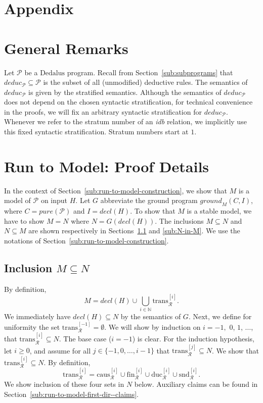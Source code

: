 \documentclass{tlp}
\newcommand{\langname}[1]{\text{#1}}  \newcommand{\pred}[1]{\mathtt{#1}}  \newcommand{\fname}[1]{\mathit{#1}}  \newcommand{\sq}[1]{`{#1}'}
\newcommand{\dedalus}{\langname{Dedalus}}
\newcommand{\Nat}{\mathbb{N}}  \newcommand{\len}[1]{|#1|} \newcommand{\rom}[1]{\text{\emph{(#1)}}} \newcommand{\romI}{\rom i}
\newcommand{\ded}{\mathcal{P}}
\newcommand{\grp}[3]{\fname{ground}_{#1}(#2,#3)}
\newcommand{\decl}[1]{\fname{decl}(#1)}
\newcommand{\pure}[1]{\fname{pure}(#1)}
\newcommand{\run}{\mathcal{R}}
\newcommand{\deduc}[1]{\fname{deduc}_{#1}}
\newcommand{\slice}[1]{\mathrm{trans}_{\run}^{[#1]}}
\newcommand{\slicefin}[1]{\text{fin}_{\run}^{[#1]}}
\newcommand{\sliceduc}[1]{\text{duc}_{\run}^{[#1]}}
\newcommand{\slicesnd}[1]{\text{snd}_{\run}^{[#1]}}
\newcommand{\slicecaus}[1]{\text{caus}_{\run}^{[#1]}}
\newcommand{\grded}{G}
\begin{document}
\section*{Appendix}

\begin{appendix}

\newcommand{\strat}[2]{#1^{\to#2}}

\section*{General Remarks}

Let $\ded$ be a $\dedalus$ program. Recall from Section~\ref{sub:subprograms}
that $\deduc{\ded}\subseteq\ded$ is the subset of all (unmodified)
deductive rules. The semantics of $\deduc{\ded}$ is given by the
stratified semantics. Although the semantics of $\deduc{\ded}$ does
not depend on the chosen syntactic stratification, for technical convenience
in the proofs, we will fix an arbitrary syntactic stratification for
$\deduc{\ded}$. Whenever we refer to the stratum number of an \emph{idb}
relation, we implicitly use this fixed syntactic stratification. Stratum
numbers start at $1$.


\section{Run to Model: Proof Details}

\label{app:proof-dir-1}

In the context of Section~\ref{sub:run-to-model-construction}, we
show that $M$ is a model of $\ded$ on input $H$. Let $\grded$
abbreviate the ground program $\grp MCI$, where $C=\pure{\ded}$
and $I=\decl H$. To show that $M$ is a stable model, we have to
show $M=N$ where $N=\grded(\decl H)$. The inclusions $M\subseteq N$
and $N\subseteq M$ are shown respectively in Sections~\ref{sub:M-in-N}
and \ref{sub:N-in-M}. We use the notations of Section~\ref{sub:run-to-model-construction}.


\subsection{Inclusion $M\subseteq N$}

\label{sub:M-in-N}

By definition,
\[
M=\decl H\cup\bigcup_{i\in\Nat}\slice i.
\]
We immediately have $\decl H\subseteq N$ by the semantics of $\grded$.
Next, we define for uniformity the set $\slice{-1}=\emptyset$. We
will show by induction on $i=-1,$ $0$, $1$, $\ldots$, that $\slice i\subseteq N$.
The base case ($i=-1$) is clear. For the induction hypothesis, let
$i\geq0$, and assume for all $j\in\{-1,0,\ldots,i-1\}$ that $\slice j\subseteq N$.
We show that $\slice i\subseteq N$. By definition, 
\[
\slice i=\slicecaus i\cup\slicefin i\cup\sliceduc i\cup\slicesnd i.
\]
We show inclusion of these four sets in $N$ below. Auxiliary claims
can be found in Section~\ref{sub:run-to-model-first-dir--claims}.



\end{appendix}
\end{document}
